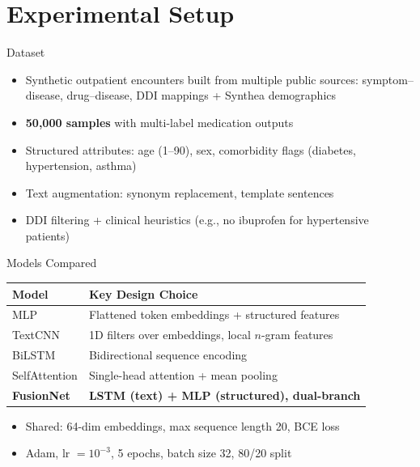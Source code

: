 \section{Experimental Setup}

\begin{frame}{Dataset}
  \begin{itemize}
    \item Synthetic outpatient encounters built from multiple public sources:
      symptom--disease, drug--disease, DDI mappings + Synthea demographics
    \pause
    \item \textbf{50,000 samples} with multi-label medication outputs
    \item Structured attributes: age (1--90), sex, comorbidity flags (diabetes, hypertension, asthma)
    \pause
    \item Text augmentation: synonym replacement, template sentences
    \item DDI filtering + clinical heuristics (e.g., no ibuprofen for hypertensive patients)
  \end{itemize}
\end{frame}

\begin{frame}{Models Compared}
  \begin{table}
    \centering
    \begin{tabular}{ll}
      \hline
      \textbf{Model} & \textbf{Key Design Choice} \\
      \hline
      MLP            & Flattened token embeddings + structured features \\
      TextCNN        & 1D filters over embeddings, local $n$-gram features \\
      BiLSTM         & Bidirectional sequence encoding \\
      SelfAttention  & Single-head attention + mean pooling \\
      \textbf{FusionNet} & \textbf{LSTM (text) + MLP (structured), dual-branch} \\
      \hline
    \end{tabular}
  \end{table}
  \pause
  \begin{itemize}
    \item Shared: 64-dim embeddings, max sequence length 20, BCE loss
    \item Adam, lr $= 10^{-3}$, 5 epochs, batch size 32, 80/20 split
  \end{itemize}
\end{frame}

